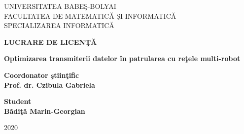\documentclass[a4paper, 12pt]{report}
\begin{document}
 
 \begin{titlepage}
 
\sloppy
\begin{center}
\Large{UNIVERSITATEA BABE\c{S}-BOLYAI}\\
\vspace{0.2cm}
\Large{FACULTATEA DE MATEMATIC\u A \c SI INFORMATIC\u A}\\
\vspace{0.2cm}
\Large{SPECIALIZAREA INFORMATIC\u A}\\
\end{center}

\vspace{3.5 cm}
\begin{center}
\Huge \textbf{LUCRARE DE LICEN\c T\u A}\\
\vspace{1 cm}

\huge \textbf{Optimizarea transmiterii datelor \^ in patrularea cu re\c tele multi-robot}
\end{center}

\vspace{3.5cm}

\begin{flushleft}
\Large{\textbf{Coordonator \c stiin\c tific}}\\
\Large{\textbf{Prof. dr. Czibula Gabriela}}
\end{flushleft}

\vspace{2.5cm}

\begin{flushright}
\Large{\textbf{Student}}\\
\Large{\textbf{B\u adi\c t\u a Marin-Georgian}}
\end{flushright}

\vspace{1 cm}
\begin{center}
\Large{2020}
\end{center}

\end{titlepage}
\end{document}
